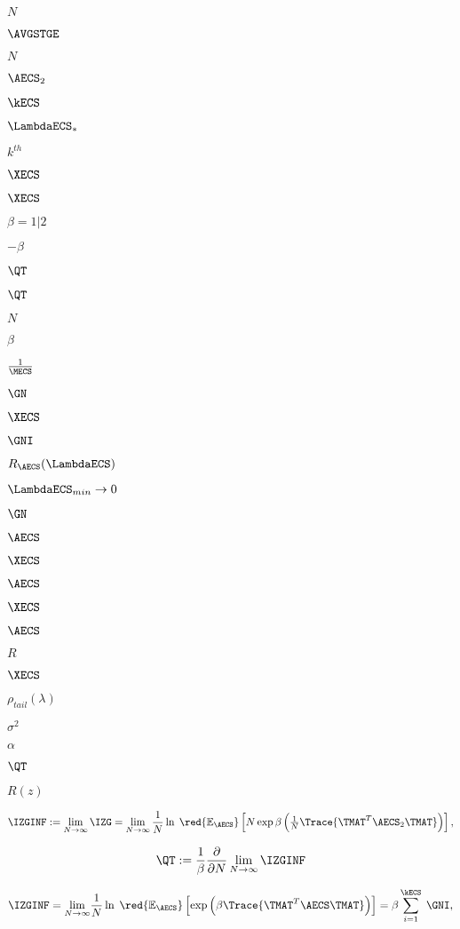 $N$

$\AVGSTGE$

$N$

$\AECS_{2}$

$\kECS$

$\LambdaECS_{*}$

$k^{th}$

$\XECS$

$\XECS$

$\beta=1|2$

$-\beta$

$\QT$

$\QT$

$N$

$\beta$

$\tfrac{1}{\MECS}$

$\GN$

$\XECS$

$\GNI$

$R_{\AECS}(\LambdaECS)$

$\LambdaECS_{min}\rightarrow 0$

$\GN$

$\AECS$

$\XECS$

$\AECS$

$\XECS$

$\AECS$

$R$

$\XECS$

$\rho_{tail}(\lambda)$

$\sigma^{2}$

$\alpha$

$\QT$

$R(z)$

\begin{equation}
  \label{eqn:IZG_limit}
  \IZGINF := \lim_{N\rightarrow \infty}\IZG = \lim_{N\rightarrow \infty}\dfrac{1}{N}\ln\; \red{\mathbb{E}_{\AECS}}\left[N\exp\beta\left( \tfrac{1}{N}\Trace{ \TMAT^{T}\AECS_{2}\TMAT } \right)\right] ,
\end{equation}

\begin{equation}
  \label{eqn:IZG_generate_Q2}
  \QT := \frac{1}{\beta}\frac{\partial }{\partial N}\lim_{N\rightarrow \infty}\IZGINF
\end{equation}

\begin{equation}
\label{eqn:tanaka_result}
\IZGINF =  \underset{N\rightarrow\infty}{\lim}\dfrac{1}{N}\ln\;
  \red{\mathbb{E}_{\AECS}}\left[\exp\left(\beta \Trace{\TMAT^{T}\AECS\TMAT } \right)\right]
  =\beta\sum\limits_{i=1}^{\kECS}\;\GNI,
\end{equation}

